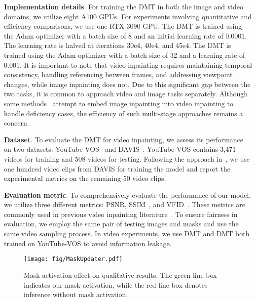 \documentclass[10pt,twocolumn,letterpaper]{article}
\begin{document}
\noindent
\textbf{Implementation details}. For training the DMT in both the image and video domains, we utilize eight A100 GPUs. For experiments involving quantitative and efficiency comparisons, we use one RTX 3090 GPU. The DMT is trained using the Adam optimizer with a batch size of 8 and an initial learning rate of 0.0001. The learning rate is halved at iterations 30e4, 40e4, and 45e4. The DMT is trained using the Adam optimizer with a batch size of 32 and a learning rate of 0.001. It is important to note that video inpainting requires maintaining temporal consistency, handling referencing between frames, and addressing viewpoint changes, while image inpainting does not. Due to this significant gap between the two tasks, it is common to approach video and image tasks separately. Although some methods~\cite{xu19dfc} attempt to embed image inpainting into video inpainting to handle deficiency cases, the efficiency of such multi-stage approaches remains a concern.

\noindent
\textbf{Dataset}. To evaluate the DMT for video inpainting, we assess its performance on two datasets: YouTube-VOS~\cite{youtubevos} and DAVIS~\cite{davis}. YouTube-VOS contains 3,471 videos for training and 508 videos for testing. Following the approach in~\cite{liu21fuseformer}, we use one hundred video clips from DAVIS for training the model and report the experimental metrics on the remaining 50 video clips.

\noindent
\textbf{Evaluation metric}.
To comprehensively evaluate the performance of our model, we utilize three different metrics: PSNR, SSIM~\cite{DBLP:journals/tip/WangBSS04}, and VFID~\cite{DBLP:conf/nips/Wang0ZYTKC18}. These metrics are commonly used in previous video inpainting literature~\cite{zeng20sttn,liu21fuseformer}. To ensure fairness in evaluation, we employ the same pair of testing images and masks and use the same video sampling process. In video experiments, we use DMT and DMT both trained on YouTube-VOS to avoid information leakage.


\begin{figure}[t]
  \centering
  \texttt{[image: fig/MaskUpdater.pdf]}
\caption{Mask activation effect on qualitative results. The green-line box indicates our mask activation, while the red-line box denotes inference without mask activation.}\label{fig:illustrate_mask_updater}
\end{figure}
\end{document}
